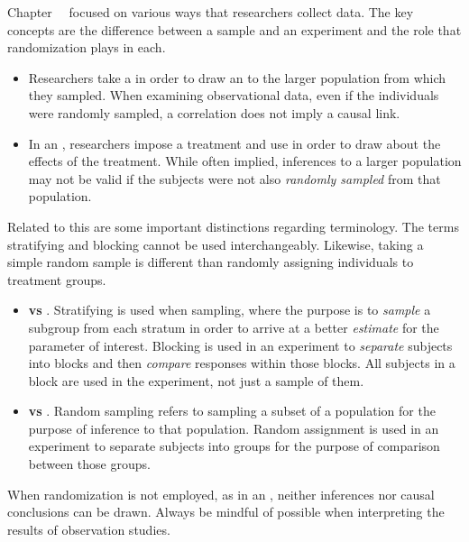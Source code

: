 \noindent Chapter~\thechapter~ focused on various ways that researchers collect data.  The key concepts are the difference between a sample and an experiment and the role that randomization plays in each.
\begin{itemize}
\item Researchers take a  in order to draw an  to the larger population from which they sampled.  When examining observational data, even if the individuals were randomly sampled, a correlation does not imply a causal link.  
\item In an , researchers impose a treatment and use  in order to draw  about the effects of the treatment.  While often implied, inferences to a larger population may not be valid if the subjects were not also \textit{randomly sampled} from that population.

\end{itemize}
Related to this are some important distinctions regarding terminology.  The terms stratifying and blocking cannot be used interchangeably.  Likewise, taking a simple random sample is different than randomly assigning individuals to treatment groups.  
\begin{itemize}
\item \textbf{ vs }.  Stratifying is used when sampling, where the purpose is to \emph{sample} a subgroup from each stratum in order to arrive at a better \textit{estimate} for the parameter of interest.  Blocking is used in an experiment to \emph{separate} subjects into blocks and then \emph{compare} responses within those blocks.  All subjects in a block are used in the experiment, not just a sample of them.
\item \textbf{ vs }.  Random sampling refers to sampling a subset of a population for the purpose of inference to that population.  Random assignment is used in an experiment to separate subjects into groups for the purpose of comparison between those groups.  
\end{itemize}  
When randomization is not employed, as in an , neither inferences nor causal conclusions can be drawn.  Always be mindful of possible  when interpreting the results of observation studies.



